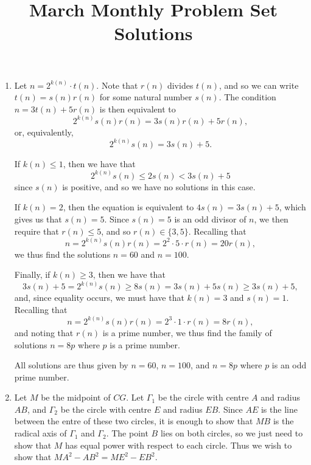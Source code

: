 \documentclass[12pt]{article}
\title{\vspace{-24pt}March Monthly Problem Set Solutions}
\author{\vspace{-24pt}}
\date{\vspace{-24pt}}
\begin{document}
 \maketitle \pagestyle{empty}

\begin{enumerate}

\item %
Let $n = 2^{k(n)} \cdot t(n)$. Note that $r(n)$ divides $t(n)$, and so we can
write $t(n) = s(n) r(n)$ for some natural number $s(n)$. The condition $n =
3t(n) + 5r(n)$ is then equivalent to
\[
    2^{k(n)} s(n) r(n) = 3 s(n) r(n) + 5r(n),
\]
or, equivalently,
\[
    2^{k(n)} s(n) = 3s(n) + 5.
\]

If $k(n) \leq 1$, then we have that
\[
    2^{k(n)} s(n) \leq 2s(n) < 3s(n) + 5
\]
since $s(n)$ is positive, and so we have no solutions in this case.

If $k(n) = 2$, then the equation is equivalent to $4s(n) = 3s(n) + 5$, which
gives us that $s(n) = 5$. Since $s(n) = 5$ is an odd divisor of $n$, we then
require that $r(n) \leq 5$, and so $r(n) \in \{3, 5\}$. Recalling that
\[
    n = 2^{k(n)} s(n) r(n) = 2^2 \cdot 5 \cdot r(n) = 20 r(n),
\]
we thus find the solutions $n = 60$ and $n = 100$.

Finally, if $k(n) \geq 3$, then we have that
\[
    3s(n) + 5 = 2^{k(n)} s(n) \geq 8 s(n) = 3s(n) + 5s(n) \geq 3s(n) + 5,
\]
and, since equality occurs, we must have that $k(n) = 3$ and $s(n) = 1$.
Recalling that
\[
    n = 2^{k(n)} s(n) r(n) = 2^3 \cdot 1 \cdot r(n) = 8r(n),
\]
and noting that $r(n)$ is a prime number, we thus find the family of solutions
$n = 8p$ where $p$ is a prime number.

All solutions are thus given by $n = 60$, $n = 100$, and $n = 8p$ where $p$ is
an odd prime number.


\item %
Let $M$ be the midpoint of $CG$. Let $\Gamma_1$ be the circle with centre $A$
and radius $AB$, and $\Gamma_2$ be the circle with centre $E$ and radius $EB$.
Since $AE$ is the line between the entre of these two circles, it is enough to
show that $MB$ is the radical axis of $\Gamma_1$ and $\Gamma_2$. The point $B$
lies on both circles, so we just need to show that $M$ has equal power with
respect to each circle. Thus we wish to show that $MA^2 - AB^2 = ME^2 - EB^2$.


\end{enumerate}
\end{document}

